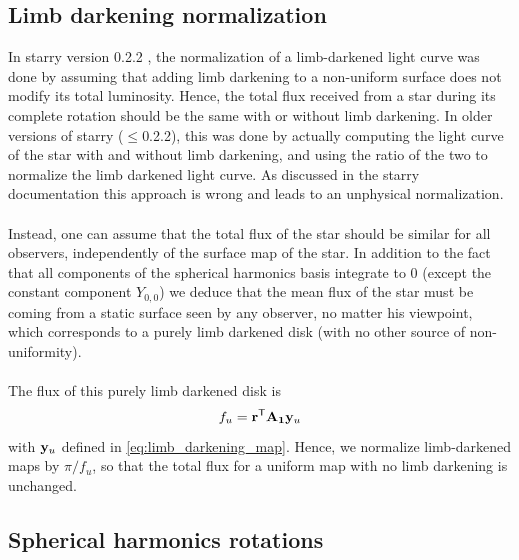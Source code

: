 \documentclass[modern]{aastex631}
\begin{document}
\subsection{Limb darkening normalization}
In \textsf{starry} version 0.2.2 \citep{starry}, the normalization of a limb-darkened light curve was done by assuming that adding limb darkening to a non-uniform surface does not modify its total luminosity. Hence, the total flux received from a star during its complete rotation should be the same with or without limb darkening. In older versions of starry ($\le$0.2.2), this was done by actually computing the light curve of the star with and without limb darkening, and using the ratio of the two to normalize the limb darkened light curve. As discussed in the \textsf{starry} documentation this approach is wrong and leads to an unphysical normalization.\\\\
Instead, one can assume that the total flux of the star should be similar for all observers, independently of the surface map of the star. In addition to the fact that all components of the spherical harmonics basis integrate to 0 (except the constant component $Y_{0,0}$) we deduce that the mean flux of the star must be coming from a static surface seen by any observer, no matter his viewpoint, which corresponds to a purely limb darkened disk (with no other source of non-uniformity).\\\\
The flux of this purely limb darkened disk is
\begin{equation}
    \label{eq:fu}
    f_u = \bvec{r}^\mathsf{T}\bvec{A_1}\bvec{y}_u
\end{equation}
with ${\mathbf{y}}_u$ defined in \autoref{eq:limb_darkening_map}. Hence, we normalize limb-darkened maps by $\pi/f_u$, so that the total flux for a uniform map with no limb darkening is unchanged.


\subsection{Spherical harmonics rotations}

\end{document}
